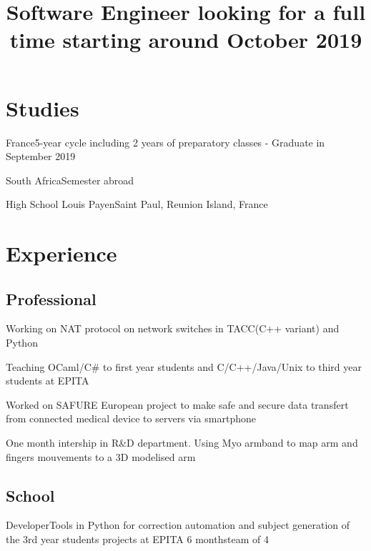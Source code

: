 \documentclass[10pt,a4paper]{moderncv}
\title{Software Engineer looking for a full time starting around October 2019}
\begin{document}
\makecvtitle

\section{Studies}

{France}{5-year cycle including 2 years of preparatory classes - Graduate in September 2019}

{South Africa}{Semester abroad}

{High School Louis Payen}{Saint Paul, Reunion Island, France}{}{}

\section{Experience}

\subsection{Professional}

{Working on NAT protocol on network switches in TACC(C++ variant) and Python}{}

{Teaching OCaml/C\# to first year students and C/C++/Java/Unix to third year students at EPITA}{}

{Worked on SAFURE European project to make safe and secure data transfert from connected medical device to servers via smartphone}{}

{One month intership in R\&D department. Using Myo armband to map arm and fingers mouvements to a 3D modelised arm}{}

\subsection{School}

{Developer}{Tools in Python for correction automation and subject generation of the 3rd year students projects at EPITA}
{6 months}{team of 4}{}
\end{document}
